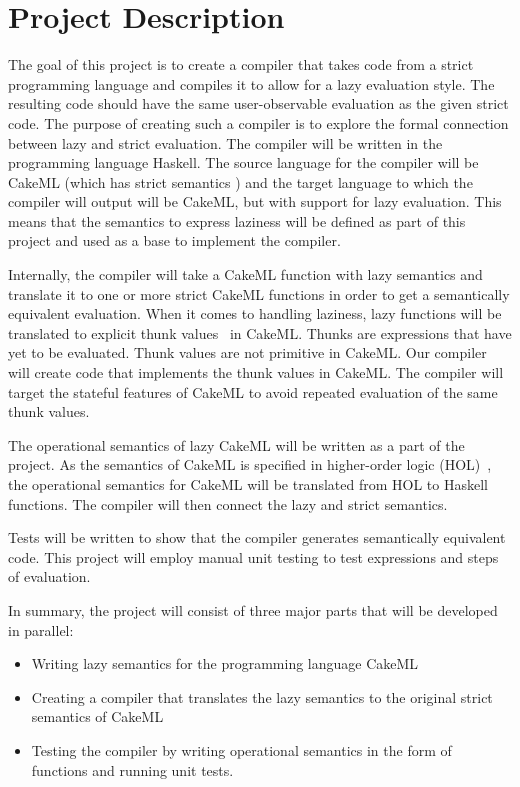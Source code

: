 \section{Project Description}
The goal of this project is to create a compiler that takes code from a strict
programming language and compiles it to allow for a lazy evaluation style. The
resulting code should have the same user-observable evaluation as the given
strict code. The purpose of creating such a compiler is to explore the formal
connection between lazy and strict evaluation. The compiler will be written in
the programming language Haskell. The source language for the compiler will be
CakeML (which has strict semantics ) and the target language to which the
compiler will output will be CakeML, but with support for lazy evaluation. This
means that the semantics to express laziness will be defined as part of this
project and used as a base to implement the compiler.

Internally, the compiler will take a
CakeML function with lazy semantics and translate it to one
or more strict CakeML functions in order to get a semantically equivalent
evaluation. When it comes to handling laziness, lazy functions will be
translated to explicit thunk values~\cite{Ingerman:1961:TWC:366062.366084} in
CakeML. Thunks are expressions that have yet to be evaluated. Thunk values are
not primitive in CakeML. Our compiler will create code that
implements the thunk values in CakeML. The compiler will target the stateful
features of CakeML to avoid repeated evaluation of the same thunk values.

The operational semantics of lazy CakeML will be written as a part of the
project. As the semantics of CakeML is specified in higher-order logic
(HOL)~\cite{HOLInter57:online},
the operational semantics for CakeML will be translated from HOL to Haskell
functions. The compiler will then connect the lazy and strict semantics.

Tests will be written to show that the compiler generates semantically
equivalent code. This project will employ manual unit testing to test
expressions and steps of evaluation.

In summary, the project will consist of three major parts that will be developed
in parallel:
\begin{itemize}
 \item Writing lazy semantics for the programming language CakeML
 \item Creating a compiler that translates the lazy semantics to the original strict semantics of CakeML
 \item Testing the compiler by writing operational semantics in the form of functions and running unit tests.
\end{itemize}
